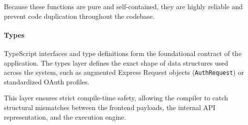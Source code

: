 Because these functions are pure and self-contained, they are highly reliable and prevent code duplication throughout the codebase.

\paragraph{Types}
TypeScript interfaces and type definitions form the foundational contract of the application. The types layer defines the exact shape of data structures used across the system, such as augmented Express Request objects (\texttt{AuthRequest}) or standardized OAuth profiles. 

This layer ensures strict compile-time safety, allowing the compiler to catch structural mismatches between the frontend payloads, the internal API representation, and the execution engine.
